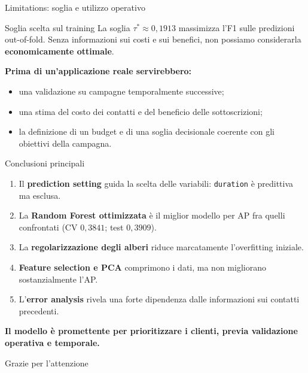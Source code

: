 \documentclass[10pt,aspectratio=169]{beamer}
\newcommand{\keypoint}[1]{\par\vspace{0.45em}\noindent{\color{teal}\rule{2.4pt}{1.25em}}\hspace{0.7em}\parbox[t]{0.92\linewidth}{\raggedright\textbf{#1}}}
\begin{document}
\begin{frame}{Limitations: soglia e utilizzo operativo}
\begin{block}{Soglia scelta sul training}
\vspace{.2em}
La soglia $\tau^*\approx0,1913$ massimizza l'F1 sulle predizioni out-of-fold. Senza informazioni sui costi e sui benefici, non possiamo considerarla \textbf{economicamente ottimale}.
\end{block}
\vspace{.75em}
\textbf{Prima di un'applicazione reale servirebbero:}
\begin{itemize}\setlength{\itemsep}{.6em}
\item una validazione su campagne temporalmente successive;
\item una stima del costo dei contatti e del beneficio delle sottoscrizioni;
\item la definizione di un budget e di una soglia decisionale coerente con gli obiettivi della campagna.
\end{itemize}
\end{frame}

\begin{frame}{Conclusioni principali}
\begin{enumerate}\setlength{\itemsep}{1em}
\item Il \textbf{prediction setting} guida la scelta delle variabili: \texttt{duration} è predittiva ma esclusa.
\item La \textbf{Random Forest ottimizzata} è il miglior modello per AP fra quelli confrontati (CV $0,3841$; test $0,3909$).
\item La \textbf{regolarizzazione degli alberi} riduce marcatamente l'overfitting iniziale.
\item \textbf{Feature selection e PCA} comprimono i dati, ma non migliorano sostanzialmente l'AP.
\item L'\textbf{error analysis} rivela una forte dipendenza dalle informazioni sui contatti precedenti.
\end{enumerate}
\vspace{.35em}
\keypoint{Il modello è promettente per prioritizzare i clienti, previa validazione operativa e temporale.}
\end{frame}

\begin{frame}[standout]
Grazie per l'attenzione
\end{frame}
\end{document}
